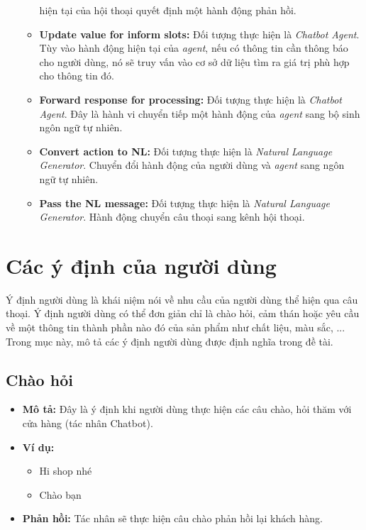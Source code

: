 \begin{itemize}
\begin{itemize}
        hiện tại của hội thoại quyết định một hành động phản hồi.
        \item \textbf{Update value for inform slots:} Đối tượng
        thực hiện là \textit{Chatbot Agent}. Tùy vào hành động
        hiện tại của \textit{agent}, nếu có thông tin cần thông báo
        cho người dùng, nó sẽ truy vấn vào cơ sở dữ liệu tìm ra
        giá trị phù hợp cho thông tin đó.
        \item \textbf{Forward response for processing:} Đối tượng
        thực hiện là \textit{Chatbot Agent}. Đây là hành vi
        chuyển tiếp một hành động của \textit{agent} sang bộ sinh
        ngôn ngữ tự nhiên.
        \item \textbf{Convert action to NL:} Đối tượng thực hiện là
        \textit{Natural Language Generator}. Chuyển đổi hành động
        của người dùng và \textit{agent} sang ngôn ngữ tự nhiên.
        \item \textbf{Pass the NL message:} Đối tượng thực hiện là
        \textit{Natural Language Generator}. Hành động chuyển
        câu thoại sang kênh hội thoại.
    \end{itemize}
\end{itemize}

\section{Các ý định của người dùng}
Ý định người dùng là khái niệm nói về nhu cầu của người dùng thể hiện
qua câu thoại. Ý định người dùng có thể đơn giản chỉ là chào hỏi,
cảm thán hoặc yêu cầu về một thông tin thành phần nào đó của sản phẩm
như chất liệu, màu sắc, ... Trong mục này, mô tả các ý định người dùng
được định nghĩa trong đề tài.

\subsection{Chào hỏi}
\begin{itemize}
    \item \textbf{Mô tả:} Đây là ý định khi người dùng thực hiện các
    câu chào, hỏi thăm với cửa hàng (tác nhân Chatbot).
    \item \textbf{Ví dụ:}
    \begin{itemize}
        \item Hi shop nhé
        \item Chào bạn
    \end{itemize}
    \item \textbf{Phản hồi:} Tác nhân sẽ thực hiện câu chào phản hồi
    lại khách hàng.
\end{itemize}

